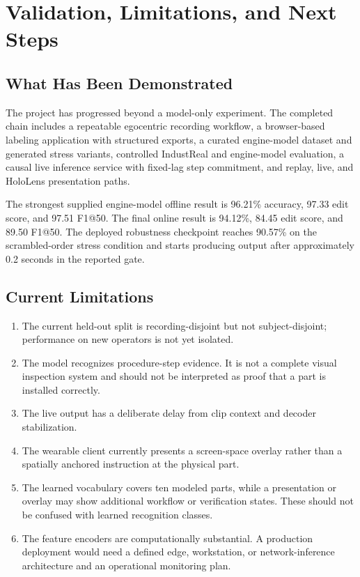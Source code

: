\chapter{Validation, Limitations, and Next Steps}

\section{What Has Been Demonstrated}

The project has progressed beyond a model-only experiment. The completed chain
includes a repeatable egocentric recording workflow, a browser-based labeling
application with structured exports, a curated engine-model dataset and
generated stress variants, controlled IndustReal and engine-model evaluation, a
causal live inference service with fixed-lag step commitment, and replay, live,
and HoloLens presentation paths.

The strongest supplied engine-model offline result is 96.21\% accuracy,
97.33 edit score, and 97.51 F1@50. The final online result is 94.12\%,
84.45 edit score, and 89.50 F1@50. The deployed robustness checkpoint reaches
90.57\% on the scrambled-order stress condition and starts producing output
after approximately 0.2 seconds in the reported gate.

\section{Current Limitations}

\begin{enumerate}
    \item The current held-out split is recording-disjoint but not
    subject-disjoint; performance on new operators is not yet isolated.
    \item The model recognizes procedure-step evidence. It is not a complete
    visual inspection system and should not be interpreted as proof that a
    part is installed correctly.
    \item The live output has a deliberate delay from clip context and decoder
    stabilization.
    \item The wearable client currently presents a screen-space overlay rather
    than a spatially anchored instruction at the physical part.
    \item The learned vocabulary covers ten modeled parts, while a presentation
    or overlay may show additional workflow or verification states. These
    should not be confused with learned recognition classes.
    \item The feature encoders are computationally substantial. A production
    deployment would need a defined edge, workstation, or network-inference
    architecture and an operational monitoring plan.
\end{enumerate}

